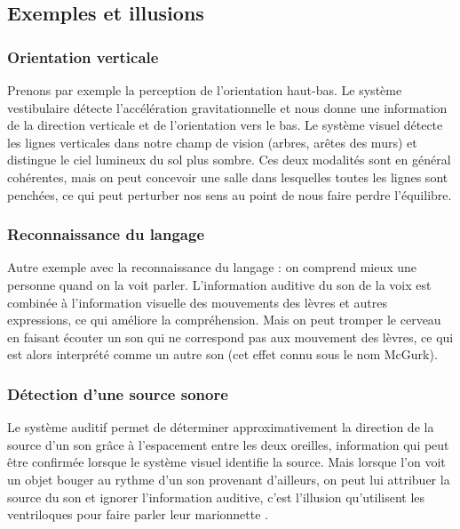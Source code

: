 \subsection{Exemples et illusions}

\subsubsection{Orientation verticale}

Prenons par exemple la perception de l'orientation haut-bas. Le système vestibulaire détecte l'accélération gravitationnelle et nous donne une information de la direction verticale et de l'orientation vers le bas. Le système visuel détecte les lignes verticales dans notre champ de vision (arbres, arêtes des murs) et distingue le ciel lumineux du sol plus sombre. Ces deux modalités sont en général cohérentes, mais on peut concevoir une salle dans lesquelles toutes les lignes sont penchées, ce qui peut perturber nos sens au point de nous faire perdre l'équilibre.

\subsubsection{Reconnaissance du langage}

Autre exemple avec la reconnaissance du langage : on comprend mieux une personne quand on la voit parler. L'information auditive du son de la voix est combinée à l'information visuelle des mouvements des lèvres et autres expressions, ce qui améliore la compréhension. Mais on peut tromper le cerveau en faisant écouter un son qui ne correspond pas aux mouvement des lèvres, ce qui est alors interprété comme un autre son (cet effet connu sous le nom McGurk). 

\subsubsection{Détection d'une source sonore}

Le système auditif permet de déterminer approximativement la direction de la source d'un son grâce à l'espacement entre les deux oreilles, information qui peut être confirmée lorsque le système visuel identifie la source. Mais lorsque l'on voit un objet bouger au rythme d'un son provenant d'ailleurs, on peut lui attribuer la source du son et ignorer l'information auditive, c'est l'illusion qu'utilisent les ventriloques pour faire parler leur marionnette \cite{bonath_neural_2007}.

